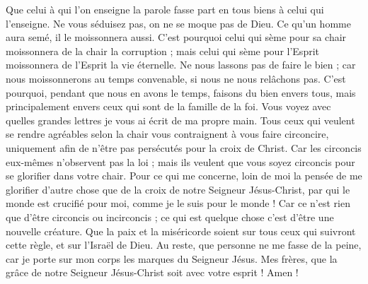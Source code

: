 \begin{multicols}{2}
Que celui à qui l’on enseigne la parole fasse part en tous biens à celui qui l'enseigne.
Ne vous séduisez pas, on ne se moque pas de Dieu. Ce qu’un homme aura semé, il le moissonnera aussi.
C'est pourquoi celui qui sème pour sa chair moissonnera de la chair la corruption ; mais celui qui sème pour l'Esprit moissonnera de l'Esprit la vie éternelle.
Ne nous lassons pas de faire le bien ; car nous moissonnerons au temps convenable, si nous ne nous relâchons pas.
C'est pourquoi, pendant que nous en avons le temps, faisons du bien envers tous, mais principalement envers ceux qui sont de la famille de la foi.
Vous voyez avec quelles grandes lettres je vous ai écrit de ma propre main.
Tous ceux qui veulent se rendre agréables selon la chair vous contraignent à vous faire circoncire, uniquement afin de n’être pas persécutés pour la croix de Christ.
Car les circoncis eux-mêmes n’observent pas la loi ; mais ils veulent que vous soyez circoncis pour se glorifier dans votre chair.
Pour ce qui me concerne, loin de moi la pensée de me glorifier d’autre chose que de la croix de notre Seigneur Jésus-Christ, par qui le monde est crucifié pour moi, comme je le suis pour le monde !
Car ce n’est rien que d’être circoncis ou incirconcis ; ce qui est quelque chose c’est d’être une nouvelle créature.
Que la paix et la miséricorde soient sur tous ceux qui suivront cette règle, et sur l'Israël de Dieu.
\TextTitle{[Conclusion]}
Au reste, que personne ne me fasse de la peine, car je porte sur mon corps les marques du Seigneur Jésus.
Mes frères, que la grâce de notre Seigneur Jésus-Christ soit avec votre esprit ! Amen !
\PPE{}
\end{multicols}
